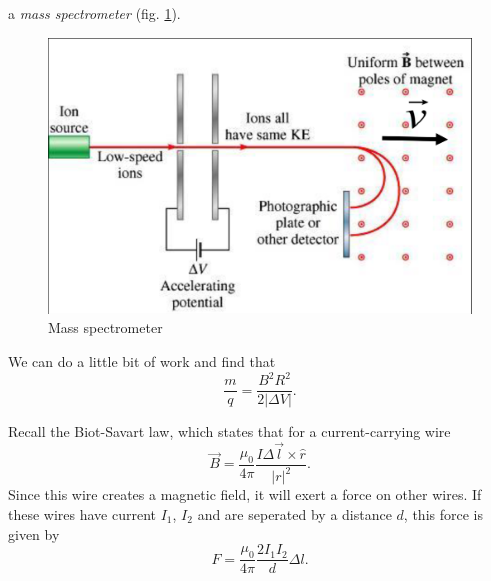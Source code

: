 \documentclass[nobib]{tufte-handout}
\begin{document}
a \emph{mass spectrometer} (fig. \ref{fig:massspec}). 
\begin{figure}
    \center 
    \caption{Mass spectrometer} 
    \label{fig:massspec}
    \includegraphics{images/massspec.png}
\end{figure}
We can do a little bit of work and find 
that 
\[\frac{m}{q} = \frac{B^2 R^2}{2|\Delta V|}.\]

Recall the Biot-Savart law, which states 
that for a current-carrying wire 
\[\vec{B} = \frac{\mu_0}{4\pi} \frac{I \Delta \vec{l} \times \hat{r}}{|r|^2}.\]
Since this wire creates a magnetic field, 
it will exert a force on other wires. 
If these wires have current $I_1$, $I_2$ and are 
seperated by a distance $d$, this force 
is given by 
\[F = \frac{\mu_0}{4\pi} \frac{2I_1 I_2}{d} \Delta l.\]
\end{document}
